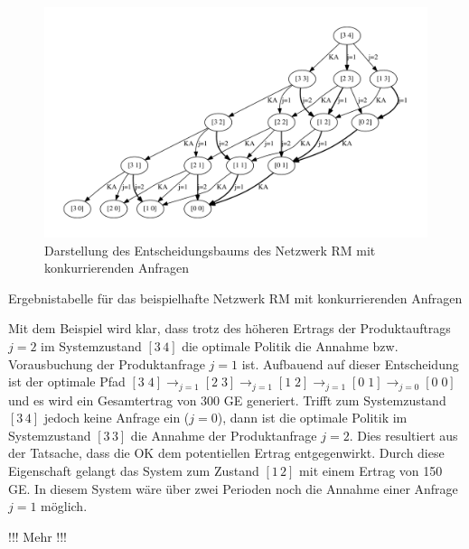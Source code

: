 \begin{figure}[h!]
  \begin{center}
    \includegraphics[width=150mm]{Bilder/Beispiel2.pdf}
    \caption{Darstellung des Entscheidungsbaums des Netzwerk RM mit konkurrierenden Anfragen}  \label{B2}
  \end{center}
\end{figure}

\begin{table}
\begin{footnotesize}
    \caption{Ergebnistabelle für das beispielhafte Netzwerk RM mit konkurrierenden Anfragen} \label{Tab2}
    \vspace*{3mm}
\end{footnotesize}
\end{table}

Mit dem Beispiel wird klar, dass trotz des höheren Ertrags der Produktauftrags $j=2$ im Systemzustand $[3\,4]$ die optimale Politik die Annahme bzw. Vorausbuchung der Produktanfrage $j=1$ ist. Aufbauend auf dieser Entscheidung ist der optimale Pfad $[3\;4] \rightarrow_{j=1} [2\;3] \rightarrow_{j=1} [1\;2] \rightarrow_{j=1} [0\;1]\rightarrow_{j=0} [0\;0]$ und es wird ein Gesamtertrag von 300 GE generiert. Trifft zum Systemzustand $[3\,4]$ jedoch keine Anfrage ein ($j=0$), dann ist die optimale Politik im Systemzustand $[3\,3]$ die Annahme der Produktanfrage $j=2$. Dies resultiert aus der Tatsache, dass die OK dem potentiellen Ertrag entgegenwirkt. Durch diese Eigenschaft gelangt das System zum Zustand $[1\,2]$ mit einem Ertrag von 150 GE. In diesem System wäre über zwei Perioden noch die Annahme einer Anfrage $j=1$ möglich.

!!! Mehr !!!
